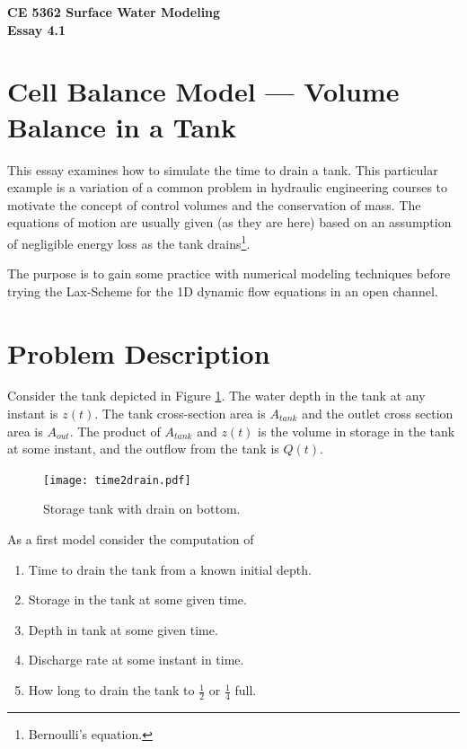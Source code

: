 \documentclass[12pt]{article}
\begin{document}
\begin{center}
{\textbf{{ CE 5362 Surface Water Modeling} \\ {Essay 4.1}}}
\end{center}

\tableofcontents

\section{Cell Balance Model --- Volume Balance in a Tank}
This essay examines how to simulate the time to drain a tank.  This particular example is a variation of a  common problem in hydraulic engineering courses to motivate the concept of control volumes and the conservation of mass.  The equations of motion are usually given (as they are here) based on an assumption of negligible energy loss as the tank drains\footnote{Bernoulli's equation.}.

The purpose is to gain some practice with numerical modeling techniques before trying the Lax-Scheme for the 1D dynamic flow equations in an open channel.

\section{Problem Description}
Consider the tank depicted in Figure \ref{fig:time2drain.pdf}.  The water depth in the tank at any instant is $z(t)$.  The tank cross-section area is $A_{tank}$ and the outlet cross section area is $A_{out}$.   The product of $A_{tank}$ and $z(t)$ is the volume in storage in the tank at some instant, and the outflow from the tank is $Q(t)$.
\begin{figure}[h!] %
   \centering
   \texttt{[image: time2drain.pdf]} 
   \caption{Storage tank with drain on bottom.}
   \label{fig:time2drain.pdf}
\end{figure}


As a first model consider the computation of 
\begin{enumerate}
\item Time to drain the tank from a known initial depth.
\item Storage in the tank at some given time.
\item Depth in tank at some given time.
\item Discharge rate at some instant in time.
\item How long to drain the tank to $\frac{1}{2}$ or $\frac{1}{4}$ full.
\end{enumerate}
\end{document}
